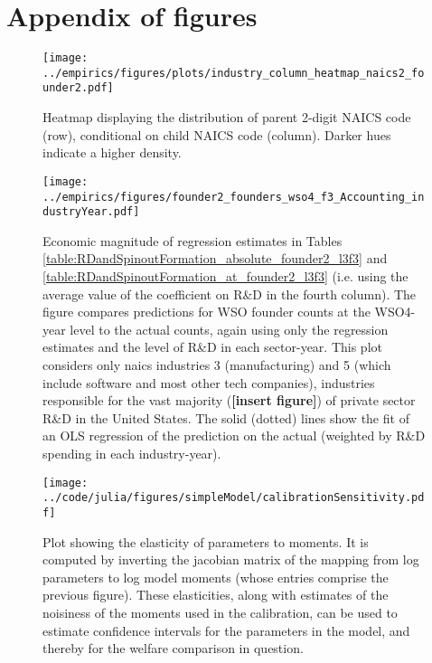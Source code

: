 \documentclass[11pt,english]{article}
\begin{document}
\newpage
\section{Appendix of figures}

\setcounter{figure}{0}
\renewcommand{\thefigure}{\Alph{section}\arabic{figure}}

\begin{figure}[!htb]
	\centering
	\texttt{[image: ../empirics/figures/plots/industry\_column\_heatmap\_naics2\_founder2.pdf]}
	\caption{Heatmap displaying the distribution of parent 2-digit NAICS code (row), conditional on child NAICS code (column). Darker hues indicate a higher density.}
	\label{figure:industry_column_heatmap_naics2_founder2}
\end{figure}

\begin{figure}[]
	\centering
	\texttt{[image: ../empirics/figures/founder2\_founders\_wso4\_f3\_Accounting\_industryYear.pdf]}
	\caption{Economic magnitude of regression estimates in Tables \ref{table:RDandSpinoutFormation_absolute_founder2_l3f3} and \ref{table:RDandSpinoutFormation_at_founder2_l3f3} (i.e. using the average value of the coefficient on R\&D in the fourth column). The figure compares predictions for WSO founder counts at the WSO4-year level to the actual counts, again using only the regression estimates and the level of R\&D in each sector-year. This plot considers only naics industries 3 (manufacturing) and 5 (which include software and most other tech companies), industries responsible for the vast majority (\textbf{[insert figure]}) of private sector R\&D in the United States. The solid (dotted) lines show the fit of an OLS regression of the prediction on the actual (weighted by R\&D spending in each industry-year).}
	\label{figure:founder2_founders_f3_Accounting_industryYear}
\end{figure}

\begin{figure}[]
	\texttt{[image: ../code/julia/figures/simpleModel/calibrationSensitivity.pdf]}
	\caption{Plot showing the elasticity of parameters to moments. It is computed by inverting the jacobian matrix of the mapping from log parameters to log model moments (whose entries comprise the previous figure). These elasticities, along with estimates of the noisiness of the moments used in the calibration, can be used to estimate confidence intervals for the parameters in the model, and thereby for the welfare comparison in question.}
	\label{calibration_sensitivity}
\end{figure}
\end{document}
